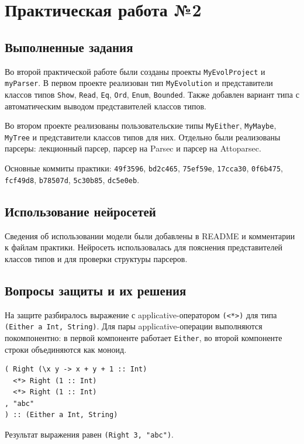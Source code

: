 \section{Практическая работа №2}
\label{sec:pr2}

\subsection{Выполненные задания}

Во второй практической работе были созданы проекты \texttt{MyEvolProject} и \texttt{myParser}. В первом проекте реализован тип \texttt{MyEvolution} и представители классов типов \texttt{Show}, \texttt{Read}, \texttt{Eq}, \texttt{Ord}, \texttt{Enum}, \texttt{Bounded}. Также добавлен вариант типа с автоматическим выводом представителей классов типов.

Во втором проекте реализованы пользовательские типы \texttt{MyEither}, \texttt{MyMaybe}, \texttt{MyTree} и представители классов типов для них. Отдельно были реализованы парсеры: лекционный парсер, парсер на Parsec и парсер на Attoparsec.

Основные коммиты практики: \texttt{49f3596}, \texttt{bd2c465}, \texttt{75ef59e}, \texttt{17cca30}, \texttt{0f6b475}, \texttt{fcf49d8}, \texttt{b78507d}, \texttt{5c30b85}, \texttt{dc5e0eb}.

\subsection{Использование нейросетей}

Сведения об использовании модели были добавлены в README и комментарии к файлам практики. Нейросеть использовалась для пояснения представителей классов типов и для проверки структуры парсеров.

\subsection{Вопросы защиты и их решения}

На защите разбиралось выражение с applicative-оператором \texttt{(<*>)} для типа \texttt{(Either a Int, String)}. Для пары applicative-операции выполняются покомпонентно: в первой компоненте работает \texttt{Either}, во второй компоненте строки объединяются как моноид.

\label{lst:lab2-defense}
\begin{verbatim}
( Right (\x y -> x + y + 1 :: Int)
  <*> Right (1 :: Int)
  <*> Right (1 :: Int)
, "abc"
) :: (Either a Int, String)
\end{verbatim}

Результат выражения равен \texttt{(Right 3, "abc")}.

\newpage
